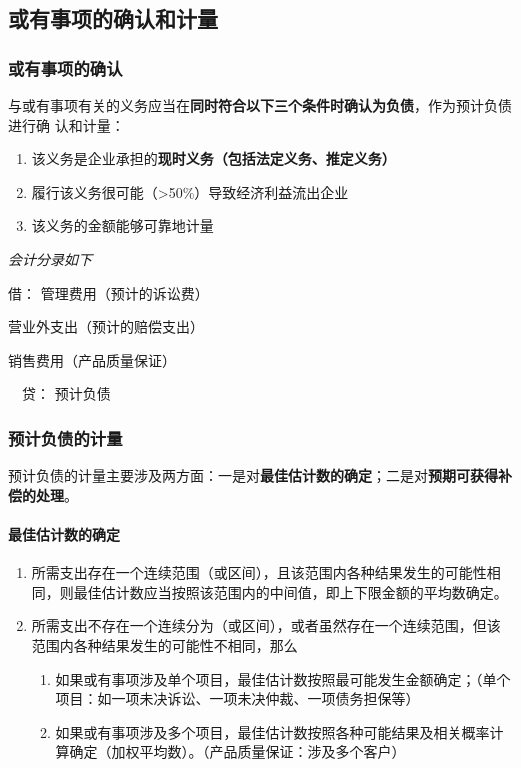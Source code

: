\documentclass[UTF8,12pt]{ctexart}
\newenvironment{Dr}{\noindent 借：}{\par}
\newenvironment{Cr}{\noindent \ \ 贷：}{\par}
\numberwithin{equation}{section} %
\numberwithin{figure}{section}
\numberwithin{table}{section}
\begin{document}
	\subsection{或有事项的确认和计量}
	\subsubsection{或有事项的确认}
	与或有事项有关的义务应当在\textbf{同时符合以下三个条件时确认为负债}，作为预计负债进行确  认和计量：
	\begin{enumerate}
		\item 该义务是企业承担的\textbf{现时义务（包括法定义务、推定义务）}
		
		\item 履行该义务很可能（>50\%）导致经济利益流出企业
		
		\item 该义务的金额能够可靠地计量
	\end{enumerate}
	
	\textit{会计分录如下}
	
	\begin{Dr}
		管理费用（预计的诉讼费）
		
		营业外支出（预计的赔偿支出） 
		
		销售费用（产品质量保证）
	\end{Dr}
	\begin{Cr}
		预计负债
	\end{Cr}
	
	\subsubsection{预计负债的计量}
	预计负债的计量主要涉及两方面：一是对\textbf{最佳估计数的确定}；二是对\textbf{预期可获得补偿的处理}。
	
	\paragraph{最佳估计数的确定}
	\begin{enumerate}
		\item 所需支出存在一个连续范围（或区间），且该范围内各种结果发生的可能性相同，则最佳估计数应当按照该范围内的中间值，即上下限金额的平均数确定。
		
		\item 所需支出不存在一个连续分为（或区间），或者虽然存在一个连续范围，但该范围内各种结果发生的可能性不相同，那么
		\begin{enumerate}
			\item 如果或有事项涉及单个项目，最佳估计数按照最可能发生金额确定；（单个项目：如一项未决诉讼、一项未决仲裁、一项债务担保等）
			
			\item 如果或有事项涉及多个项目，最佳估计数按照各种可能结果及相关概率计算确定（加权平均数）。（产品质量保证：涉及多个客户）
		\end{enumerate}
	\end{enumerate}
	
\end{document}
